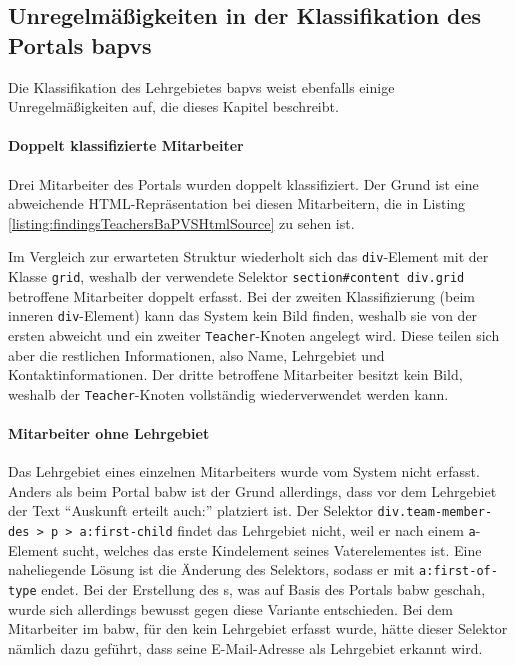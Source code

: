 \subsection{Unregelmäßigkeiten in der Klassifikation des Portals \acrshort{bapvs}}
    \label{section:findingsTeachersAbnormalitiesBaPVS}
    Die Klassifikation des Lehrgebietes \gls{bapvs}
    weist ebenfalls einige Unregelmäßigkeiten auf,
    die dieses Kapitel beschreibt.

    \paragraph{Doppelt klassifizierte Mitarbeiter}
    Drei Mitarbeiter des Portals wurden doppelt klassifiziert.
    Der Grund ist eine abweichende HTML-Repräsentation bei diesen Mitarbeitern,
    die in Listing \ref{listing:findingsTeachersBaPVSHtmlSource} zu sehen ist.

    

    Im Vergleich zur erwarteten Struktur wiederholt sich
    das \texttt{div}-Element mit der Klasse \texttt{grid},
    weshalb der verwendete Selektor \texttt{section\#content div.grid}
    betroffene Mitarbeiter doppelt erfasst.
    Bei der zweiten Klassifizierung
    (beim inneren \texttt{div}-Element) kann das System kein Bild finden,
    weshalb sie von der ersten abweicht und ein zweiter \texttt{Teacher}-Knoten angelegt wird.
    Diese teilen sich aber die restlichen Informationen,
    also Name, Lehrgebiet und Kontaktinformationen.
    Der dritte betroffene Mitarbeiter besitzt kein Bild,
    weshalb der \texttt{Teacher}-Knoten vollständig wiederverwendet werden kann.

    \paragraph{Mitarbeiter ohne Lehrgebiet}
    Das Lehrgebiet eines einzelnen Mitarbeiters wurde vom System nicht erfasst.
    Anders als beim Portal \gls{babw} ist der Grund allerdings,
    dass vor dem Lehrgebiet der Text "`Auskunft erteilt auch:"' platziert ist.
    Der Selektor \texttt{div.team-member-des > p > a:first-child} findet
    das Lehrgebiet nicht, weil er nach einem \texttt{a}-Element sucht,
    welches das erste Kindelement seines Vaterelementes ist.
    Eine naheliegende Lösung ist die Änderung des Selektors,
    sodass er mit \texttt{a:first-of-type} endet.
    Bei der Erstellung des {\classificationModel}s,
    was auf Basis des Portals \gls{babw} geschah,
    wurde sich allerdings bewusst gegen diese Variante entschieden.
    Bei dem Mitarbeiter im \gls{babw}, für den kein Lehrgebiet erfasst
    wurde,
    hätte dieser Selektor nämlich dazu geführt,
    dass seine E-Mail-Adresse als Lehrgebiet erkannt wird.

